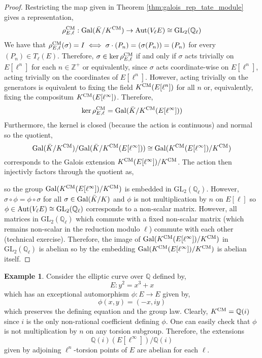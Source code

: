 \documentclass[12pt]{article}
\newcommand{\Z}{\mathbb{Z}}
\newcommand{\Q}{\mathbb{Q}}
\newcommand{\Gal}[1]{\mathrm{Gal} \small(#1 \small)}
\newcommand{\Aut}[1]{\mathrm{Aut} \small(#1 \small)}
\newcommand{\GL}[2]{\mathrm{GL}_{#1}(#2)}
\theoremstyle{remark}
\theoremstyle{definition}
\newtheorem*{example}{Example}
\begin{document}
\begin{proof}
Restricting the map given in Theorem \ref{thm:galois_rep_tate_module} gives a representation,
\[ \rho^{\CM}_{E, \ell} : \Gal{\bar{K} / K^{\CM}} \to \Aut{V_{\ell}E} \cong \GL{2}{\Q_{\ell}} \]
We have that $\rho^{\mathrm{CM}}_{E, \ell}(\sigma) = I \iff \sigma \cdot (P_n) = (\sigma(P_n)) = (P_n)$ for every $(P_n) \in T_{\ell}(E)$. Therefore, $\sigma \in \ker{\rho^{\mathrm{CM}}_{E, \ell}}$ if and only if $\sigma$ acts trivially on $E[\ell^n]$ for each $n \in \Z^{+}$ or equivalently, since $\sigma$ acts coordinate-wise on $E[\ell^n]$, acting trivially on the coordinates of $E[\ell^n]$. However, acting trivially on the generators is equivalent to fixing the field $K^{\mathrm{CM}}(E[\ell^n])$ for all $n$ or, equivalently, fixing the compositum $K^{\mathrm{CM}}(E[\ell^\infty])$. Therefore,
\[ \ker{\rho^{\CM}_{E,\ell}} = \Gal{\bar{K} / K^{\CM}(E[\ell^\infty])} \]
Furthermore, the kernel is closed (because the action is continuous) and normal so the quotient,
\[ \Gal{\bar{K} / K^{\CM}} / \Gal{\bar{K} / K^{\CM}(E[\ell^\infty])} \cong \Gal{K^{\CM}(E[\ell^\infty]) / K^{\CM}} \]
corresponds to the Galois extension $K^{\mathrm{CM}}(E[\ell^\infty]) / K^{\mathrm{CM}}$. 
The action then injectivly factors through the quotient as,
\begin{center}
\end{center}
so the group $\Gal{K^{\CM}(E[\ell^\infty]) / K^{\CM}}$ is embedded in $\GL{2}{\Q_{\ell}}$. However, $\sigma \circ \phi = \phi \circ \sigma$ for all $\sigma \in \Gal{\bar{K} / K}$ and $\phi$ is not multiplication by $n$ on $E[\ell]$ so $\phi \in \Aut{V_{\ell}E} \cong \GL{2}{\Q_{\ell}}$ corresponds to a non-scalar matrix. However, all matrices in $\GL{2}{\Q_{\ell}}$ which commute with a fixed non-scalar matrix (which remains non-scalar in the reduction modulo $\ell$) commute with each other (technical exercise). Therefore, the image of $\Gal{K^{\CM}(E[\ell^\infty]) / K^{\CM}}$ in $\GL{2}{\Q_{\ell}}$ is abelian so by the embedding $\Gal{K^{\CM}(E[\ell^\infty]) / K^{\CM}}$ is abelian itself. 
\end{proof}

\begin{example}
Consider the elliptic curve over $\Q$ defined by,
\[ E : y^2 = x^3 + x \]
which has an exceptional automorphism $\phi : E \to E$ given by,
\[ \phi(x, y) = (-x, iy) \]
which preserves the defining equation and the group law. Clearly, $K^{\CM} = \Q(i)$ since $i$ is the only non-rational coefficient defining $\phi$. One can easily check that $\phi$ is not multiplication by $n$ on any torsion subgroup. Therefore, the extensions
\[ \Q(i)(E[\ell^\infty]) / \Q(i) \]
given by adjoining $\ell^n$-torsion points of $E$ are abelian for each $\ell$. 
\end{example}
\end{document}
